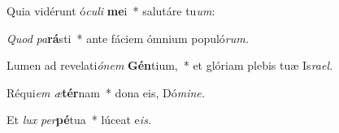 \item Quia vidérunt ó\textit{culi} \textbf{me}i~* salutáre tu\textit{um}:
\item \textit{Quod} \textit{pa}\textbf{rá}sti~* ante fáciem ómnium populó\textit{rum.}
\item Lumen ad revelati\textit{ónem} \textbf{Gén}tium,~* et glóriam plebis tuæ Is\textit{rael.}
\item Réqui\tinyhspace\textit{em} \textit{æ}\textbf{tér}nam~* dona eis, Dó\textit{mine.}
\item Et \textit{lux} \textit{per}\textbf{pé}tua~* lúceat e\tinyhspace\textit{is.}